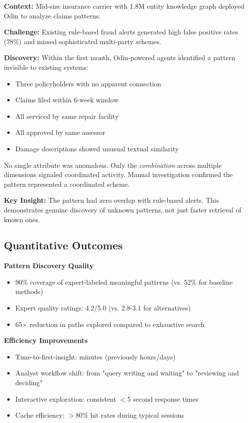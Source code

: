 \documentclass[11pt]{article}
\begin{document}
\textbf{Context:} Mid-size insurance carrier with 1.8M entity knowledge graph deployed Odin to analyze claims patterns.

\textbf{Challenge:} Existing rule-based fraud alerts generated high false positive rates (78\%) and missed sophisticated multi-party schemes.

\textbf{Discovery:} Within the first month, Odin-powered agents identified a pattern invisible to existing systems:

\begin{itemize}
\item Three policyholders with no apparent connection
\item Claims filed within 6-week window
\item All serviced by same repair facility
\item All approved by same assessor
\item Damage descriptions showed unusual textual similarity
\end{itemize}

No single attribute was anomalous. Only the \textit{combination} across multiple dimensions signaled coordinated activity. Manual investigation confirmed the pattern represented a coordinated scheme.

\textbf{Key Insight:} The pattern had zero overlap with rule-based alerts. This demonstrates genuine discovery of unknown patterns, not just faster retrieval of known ones.

\subsection{Quantitative Outcomes}

\textbf{Pattern Discovery Quality}
\begin{itemize}
\item 90\% coverage of expert-labeled meaningful patterns (vs. 52\% for baseline methods)
\item Expert quality ratings: 4.2/5.0 (vs. 2.8-3.1 for alternatives)
\item 65× reduction in paths explored compared to exhaustive search
\end{itemize}

\textbf{Efficiency Improvements}
\begin{itemize}
\item Time-to-first-insight: minutes (previously hours/days)
\item Analyst workflow shift: from "query writing and waiting" to "reviewing and deciding"
\item Interactive exploration: consistent $<$5 second response times
\item Cache efficiency: $>$80\% hit rates during typical sessions
\end{itemize}
\end{document}
